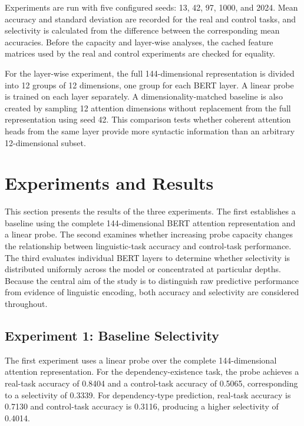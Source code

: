 \documentclass[12pt,a4paper]{article}
\begin{document}
Experiments are run with five configured seeds: 13, 42, 97, 1000, and 2024. Mean accuracy and standard deviation are recorded for the real and control tasks, and selectivity is calculated from the difference between the corresponding mean accuracies. Before the capacity and layer-wise analyses, the cached feature matrices used by the real and control experiments are checked for equality.

For the layer-wise experiment, the full 144-dimensional representation is divided into 12 groups of 12 dimensions, one group for each BERT layer. A linear probe is trained on each layer separately. A dimensionality-matched baseline is also created by sampling 12 attention dimensions without replacement from the full representation using seed 42. This comparison tests whether coherent attention heads from the same layer provide more syntactic information than an arbitrary 12-dimensional subset.


\section{Experiments and Results}

This section presents the results of the three experiments. The first establishes a baseline using the complete 144-dimensional BERT attention representation and a linear probe. The second examines whether increasing probe capacity changes the relationship between linguistic-task accuracy and control-task performance. The third evaluates individual BERT layers to determine whether selectivity is distributed uniformly across the model or concentrated at particular depths. Because the central aim of the study is to distinguish raw predictive performance from evidence of linguistic encoding, both accuracy and selectivity are considered throughout.

\subsection{Experiment 1: Baseline Selectivity}

The first experiment uses a linear probe over the complete 144-dimensional attention representation. For the dependency-existence task, the probe achieves a real-task accuracy of 0.8404 and a control-task accuracy of 0.5065, corresponding to a selectivity of 0.3339. For dependency-type prediction, real-task accuracy is 0.7130 and control-task accuracy is 0.3116, producing a higher selectivity of 0.4014.
\end{document}
